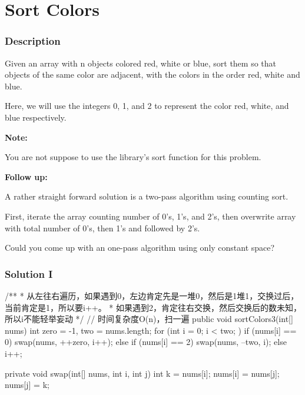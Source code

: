 \newpage

\section{Sort Colors} %

\subsubsection{Description}
Given an array with n objects colored red, white or blue, sort them so that objects of the same color are adjacent, with the colors in the order red, white and blue.

Here, we will use the integers 0, 1, and 2 to represent the color red, white, and blue respectively.

\textbf{Note:}

You are not suppose to use the library's sort function for this problem.

\textbf{Follow up:}

A rather straight forward solution is a two-pass algorithm using counting sort.

First, iterate the array counting number of 0's, 1's, and 2's, then overwrite array with total number of 0's, then 1's and followed by 2's.

Could you come up with an one-pass algorithm using only constant space?

\subsubsection{Solution I}

\begin{Code}
/**
 * 从左往右遍历，如果遇到0，左边肯定先是一堆0，然后是1堆1，交换过后，当前肯定是1，所以要i++。
 * 如果遇到2，肯定往右交换，然后交换后的数未知，所以i不能轻举妄动
 */
// 时间复杂度O(n)，扫一遍
public void sortColors3(int[] nums) {
    int zero = -1, two = nums.length;
    for (int i = 0; i < two; ) {
        if (nums[i] == 0) {
            swap(nums, ++zero, i++);
        } else if (nums[i] == 2) {
            swap(nums, --two, i);
        } else {
            i++;
        }
    }
}

private void swap(int[] nums, int i, int j) {
    int k = nums[i];
    nums[i] = nums[j];
    nums[j] = k;
}
\end{Code}

\newpage
